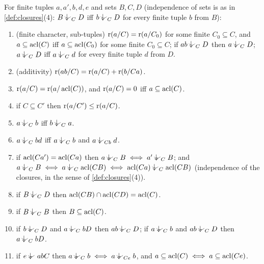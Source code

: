 \begin{lemma}\label{lem:rank}
For finite tuples $a,a',b,d,e$ and sets $B,C,D$ (independence of sets is as in
\cref{def:closures}(4): $B\ind{C}D$ iff $b\ind{C}D$ for every finite tuple $b$ from $B$):
\begin{enumerate}[label=\textup{(R\arabic*)},start=0]
\item\label{R:sub} (finite character, sub-tuples) $\operatorname{r}(a/C)=\operatorname{r}(a/C_0)$ for some finite
  $C_0\subseteq C$, and $a\subseteq\operatorname{acl}(C)$ iff $a\subseteq\operatorname{acl}(C_0)$ for some finite
  $C_0\subseteq C$; if $ab\ind{C}D$ then $a\ind{C}D$; $a\ind{C}D$ iff $a\ind{C}d$ for
  every finite tuple $d$ from $D$.
\item\label{R:add} (additivity) $\operatorname{r}(ab/C)=\operatorname{r}(a/C)+\operatorname{r}(b/Ca)$.
\item\label{R:acl} $\operatorname{r}(a/C)=\operatorname{r}(a/\operatorname{acl}(C))$, and $\operatorname{r}(a/C)=0$ iff $a\subseteq\operatorname{acl}(C)$.
\item\label{R:mono} if $C\subseteq C'$ then $\operatorname{r}(a/C')\le\operatorname{r}(a/C)$.
\item\label{R:sym} $a\ind{C}b$ iff $b\ind{C}a$.
\item\label{R:trans} $a\ind{C}bd$ iff $a\ind{C}b$ and $a\ind{Cb}d$.
\item\label{R:aclinv} if $\operatorname{acl}(Ca')=\operatorname{acl}(Ca)$ then $a\ind{C}B \iff a'\ind{C}B$; and
  $a\ind{C}B\iff a\ind{C}\acl(CB)\iff \acl(Ca)\ind{C}\acl(CB)$ (independence of the
  closures, in the sense of \cref{def:closures}(4)).
\item\label{R:meet} if $B\ind{C}D$ then $\operatorname{acl}(CB)\cap\operatorname{acl}(CD)=\operatorname{acl}(C)$.
\item\label{R:selfind} if $B\ind{C}B$ then $B\subseteq\operatorname{acl}(C)$.
\item\label{R:swap} if $b\ind{C}D$ and $a\ind{C}bD$ then $ab\ind{C}D$; if
  $a\ind{C}b$ and $ab\ind{C}D$ then $a\ind{C}bD$.
\item\label{R:basechange} if $e\ind{}abC$ then $a\ind{C}b\iff a\ind{Ce}b$, and
  $a\subseteq\operatorname{acl}(C)\iff a\subseteq\operatorname{acl}(Ce)$.
\end{enumerate}
\end{lemma}

